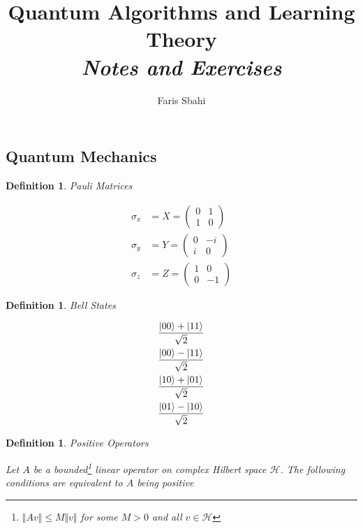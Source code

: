 \documentclass[11pt]{article}
\date{}
\title{Quantum Algorithms and Learning Theory\\\textit{Notes and Exercises}}
\author{Faris Sbahi}
\newcommand\0{\mathbf{0}}
\newcommand\<{\langle}
\renewcommand\>{\rangle}
\newtheorem{definition}[theorem]{Definition}
\begin{document}
\maketitle

\tableofcontents







\begin{appendices}
\section{Quantum Mechanics}

\begin{definition}
\label{pauli}
Pauli Matrices

\begin{align*}
\sigma_x &= X = \begin{pmatrix} 0 & 1 \\ 1 & 0\end{pmatrix} \\
\sigma_y &= Y = \begin{pmatrix} 0 & -i \\ i & 0\end{pmatrix}\\
\sigma_z &= Z = \begin{pmatrix} 1 & 0 \\ 0 & -1\end{pmatrix}
\end{align*}
\end{definition}

\begin{definition}
\label{bellstates}
Bell States

\begin{align*}
\frac{\ket{00} + \ket{11} }{\sqrt{2}} \\	
\frac{\ket{00} - \ket{11} }{\sqrt{2}} \\	
\frac{\ket{10} + \ket{01} }{\sqrt{2}} \\	
\frac{\ket{01} - \ket{10} }{\sqrt{2}}
\end{align*}
\end{definition}

\begin{definition}
\label{posop}
Positive Operators

Let $A$ be a bounded\footnote{$\Vert Av \Vert \leq M\Vert v \Vert$ for some $M>0$ and all $v \in \mathcal{H}$} linear operator on complex Hilbert space $\mathcal{H}$. The following conditions are equivalent to $A$ being positive


\end{definition}
\end{appendices}
\end{document}
